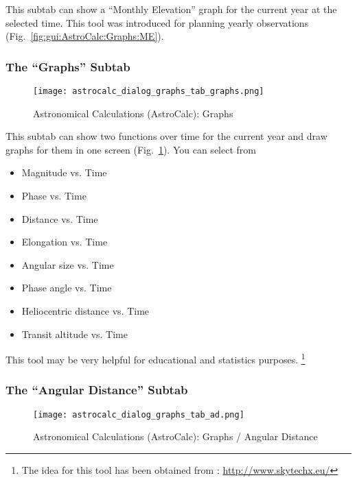 This subtab  can show a ``Monthly Elevation'' graph for the current year at the selected time.
This tool was introduced for planning yearly observations (Fig.~\ref{fig:gui:AstroCalc:Graphs:ME}).

\subsubsection{The ``Graphs'' Subtab}
\label{sec:gui:AstroCalc:Graphs:Graphs}
    
\begin{figure}[htbp]
\centering\texttt{[image: astrocalc\_dialog\_graphs\_tab\_graphs.png]}
\caption{Astronomical Calculations (AstroCalc): Graphs}
\label{fig:gui:AstroCalc:Graphs:Graphs}
\end{figure}
  
This subtab  can show two functions over time for the current year and draw graphs for them in one screen (Fig.~\ref{fig:gui:AstroCalc:Graphs:Graphs}). 
You can select from 
\begin{itemize}
\item Magnitude vs. Time
\item Phase vs. Time
\item Distance vs. Time 
\item Elongation vs. Time 
\item Angular size vs. Time
\item Phase angle vs. Time
\item Heliocentric distance vs. Time
\item Transit altitude vs. Time
\end{itemize}

This tool may be very helpful for educational and statistics purposes.%
	\footnote{The idea for this tool has been obtained from : \url{http://www.skytechx.eu/}}
	
\subsubsection{The ``Angular Distance'' Subtab}
\label{sec:gui:AstroCalc:Graphs:AD}

\begin{figure}[htbp]
\centering\texttt{[image: astrocalc\_dialog\_graphs\_tab\_ad.png]}
\caption{Astronomical Calculations (AstroCalc): Graphs / Angular Distance}
\label{fig:gui:AstroCalc:Graphs:AD}
\end{figure}

